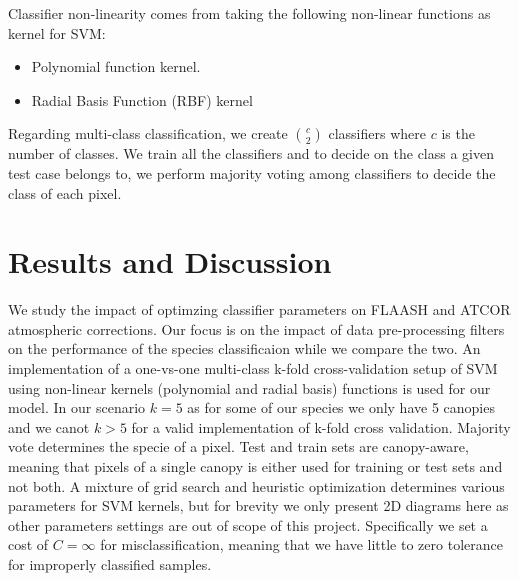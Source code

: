 \documentclass[remotesensing,article,accept,moreauthors,pdftex,12pt,a4paper]{mdpi}
\begin{document}
Classifier non-linearity comes from taking the following non-linear functions as kernel for SVM: 

\begin{itemize}
\item Polynomial function kernel.
\item Radial Basis Function (RBF) kernel
\end{itemize}

Regarding multi-class classification, we create $\binom{c}{2}$ classifiers where $c$ is the number of classes. 
We train all the classifiers and to decide on the class a given test case belongs to, we perform majority voting among classifiers to decide the class of each pixel. 








\section{Results and Discussion}

We study the impact of optimzing classifier parameters on FLAASH and ATCOR atmospheric corrections. 
Our focus is on the impact of data pre-processing filters on the performance of the species classificaion while we compare the two. 
An implementation of a one-vs-one multi-class k-fold cross-validation setup of SVM using non-linear kernels (polynomial and radial basis) functions is used for our model. 
In our scenario $k=5$ as for some of our species we only have 5 canopies and we canot $k>5$ for a valid implementation of k-fold cross validation.
Majority vote determines the specie of a pixel. 
Test and train sets are canopy-aware, meaning that pixels of a single canopy is either used for training or test sets and not both.
A mixture of grid search and heuristic optimization determines various parameters for SVM kernels, but for brevity we only present 2D diagrams here as other parameters settings are out of scope of this project. 
Specifically we set a cost of $C = \infty$ for misclassification, meaning that we have little to zero tolerance for improperly classified samples.

\end{document}
